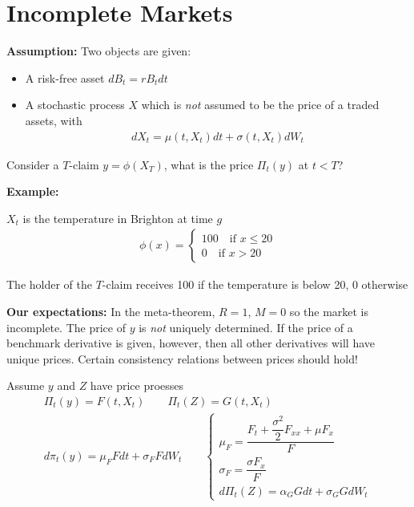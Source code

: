 \section{Incomplete Markets}
\noindent\textbf{Assumption:} Two objects are given:\par
\begin{itemize}
  \item A risk-free asset $dB_t = rB_tdt$
  \item A stochastic process $X$ which is \textit{not} assumed to be the price of a traded assets, with 
    \begin{equation*}
      \begin{gathered}
        dX_t = \mu(t,X_t)dt+\sigma(t,X_t)dW_t
      \end{gathered}
    \end{equation*}
\end{itemize}
\par\bigskip
\noindent Consider a $T$-claim $y = \phi(X_T)$, what is the price $\Pi_t(y)$ at $t<T$?
\par\bigskip
\noindent\textbf{Example:}\par
\noindent $X_t$ is the temperature in Brighton at time $g$
\begin{equation*}
  \begin{gathered}
    \phi(x) = \begin{cases}
      100\quad\text{if } x\leq20\\
      0\quad\text{if } x>20
    \end{cases}
  \end{gathered}
\end{equation*}\par
\noindent The holder of the $T$-claim receives 100 if the temperature is below 20, 0 otherwise
\par\bigskip
\noindent\textbf{Our expectations:} In the meta-theorem, $R=1$, $M=0$ so the market is incomplete. The price of $y$ is \textit{not} uniquely determined. If the price of a benchmark derivative is given, however, then all other derivatives will have unique prices. Certain consistency relations between prices should hold!
\par\bigskip
\noindent Assume $y$ and $Z$ have price proesses
\begin{equation*}
  \begin{gathered}
    \Pi_t(y) = F(t,X_t)\qquad\Pi_t(Z) = G(t,X_t)\\
    d\pi_t(y) = \mu_FFdt+\sigma_FFdW_t\qquad\begin{cases}
      \mu_F = \dfrac{F_t+\dfrac{\sigma^2}{2}F_{xx}+\mu F_x}{F}\\
      \sigma_F = \dfrac{\sigma F_x}{F}\\
      d\Pi_t(Z) = \alpha_GGdt+\sigma_GGdW_t
    \end{cases}
  \end{gathered}
\end{equation*}\par
